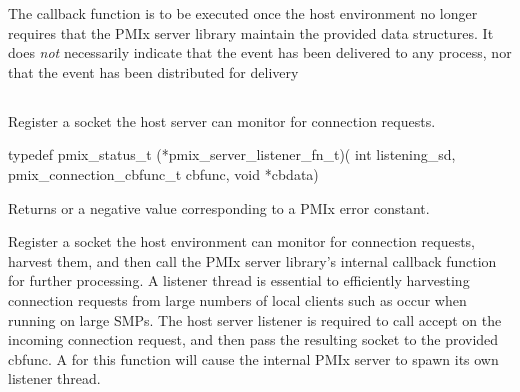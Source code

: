 \advicermstart
The callback function is to be executed once the host environment no longer requires that the \ac{PMIx} server library maintain the provided data structures. It does \emph{not} necessarily indicate that the event has been delivered to any process, nor that the event has been distributed for delivery
\advicermend


\subsection{}

\summary

Register a socket the host server can monitor for connection requests.

\format

\cspecificstart
\begin{codepar}
typedef pmix_status_t (*pmix_server_listener_fn_t)(
                             int listening_sd,
                             pmix_connection_cbfunc_t cbfunc,
                             void *cbdata)
\end{codepar}
\cspecificend

\begin{arglist}
\end{arglist}

Returns  or a negative value corresponding to a PMIx error constant.

\descr

Register a socket the host environment can monitor for connection requests, harvest them, and then call the \ac{PMIx} server library's internal callback function for further processing.
A listener thread is essential to efficiently harvesting connection requests from large numbers of local clients such as occur when running on large SMPs.
The host server listener is required to call accept on the incoming connection request, and then pass the resulting socket to the provided cbfunc.
A  for this function will cause the internal \ac{PMIx} server to spawn its own listener thread.


\subsection{}

